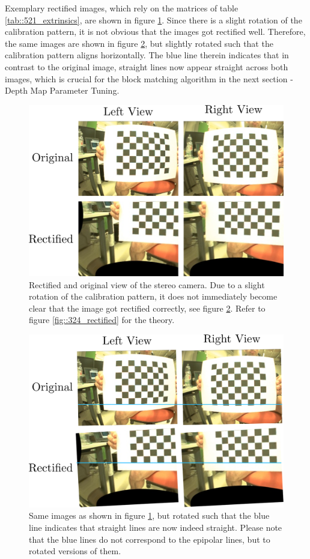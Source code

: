 Exemplary rectified images, which rely on the matrices of table \ref{tab::521_extrinsics}, are shown in figure \ref{fig::521_rect}. Since there is a slight rotation of the calibration pattern, it is not obvious that the images got rectified well. Therefore, the same images are shown in figure \ref{fig::521_rect_line}, but slightly rotated such that the calibration pattern aligns horizontally. The blue line therein indicates that in contrast to the original image, straight lines now appear straight across both images, which is crucial for the block matching algorithm in the next section - Depth Map Parameter Tuning.
\begin{figure}[h]
	\centering
	\includegraphics[scale=.28]{chapters/05_experiments/02_autonomous_walking/01_camera_calibration/rect.png}
	\caption{Rectified and original view of the stereo camera. Due to a slight rotation of the calibration pattern, it does not immediately become clear that the image got rectified correctly, see figure \ref{fig::521_rect_line}. Refer to figure \ref{fig::324_rectified} for the theory.}
	\label{fig::521_rect}
\end{figure}
\begin{figure}[h]
	\centering
	\includegraphics[scale=.28]{chapters/05_experiments/02_autonomous_walking/01_camera_calibration/rect_line.png}
	\caption{Same images as shown in figure \ref{fig::521_rect}, but rotated such that the blue line indicates that straight lines are now indeed straight. Please note that the blue lines do not correspond to the epipolar lines, but to rotated versions of them.}
	\label{fig::521_rect_line}
\end{figure}
